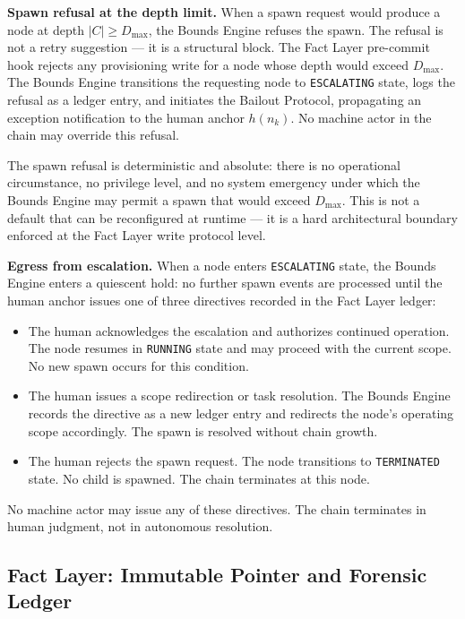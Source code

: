 \medskip
\noindent\textbf{Spawn refusal at the depth limit.} When a spawn request would produce a node at depth $|C| \geq D_{\max}$, the Bounds Engine refuses the spawn. The refusal is not a retry suggestion --- it is a structural block. The Fact Layer pre-commit hook rejects any provisioning write for a node whose depth would exceed $D_{\max}$. The Bounds Engine transitions the requesting node to \texttt{ESCALATING} state, logs the refusal as a ledger entry, and initiates the Bailout Protocol, propagating an exception notification to the human anchor $h(n_k)$. No machine actor in the chain may override this refusal.

The spawn refusal is deterministic and absolute: there is no operational circumstance, no privilege level, and no system emergency under which the Bounds Engine may permit a spawn that would exceed $D_{\max}$. This is not a default that can be reconfigured at runtime --- it is a hard architectural boundary enforced at the Fact Layer write protocol level.

\medskip
\noindent\textbf{Egress from escalation.} When a node enters \texttt{ESCALATING} state, the Bounds Engine enters a quiescent hold: no further spawn events are processed until the human anchor issues one of three directives recorded in the Fact Layer ledger:

\begin{itemize}
    \item[\texttt{ACK}] The human acknowledges the escalation and authorizes continued operation. The node resumes in \texttt{RUNNING} state and may proceed with the current scope. No new spawn occurs for this condition.
    \item[\texttt{RESOLVE}] The human issues a scope redirection or task resolution. The Bounds Engine records the directive as a new ledger entry and redirects the node's operating scope accordingly. The spawn is resolved without chain growth.
    \item[\texttt{REJECT}] The human rejects the spawn request. The node transitions to \texttt{TERMINATED} state. No child is spawned. The chain terminates at this node.
\end{itemize}

No machine actor may issue any of these directives. The chain terminates in human judgment, not in autonomous resolution.

\subsection{Fact Layer: Immutable Pointer and Forensic Ledger}
\label{sec:rsp-fact-layer}

